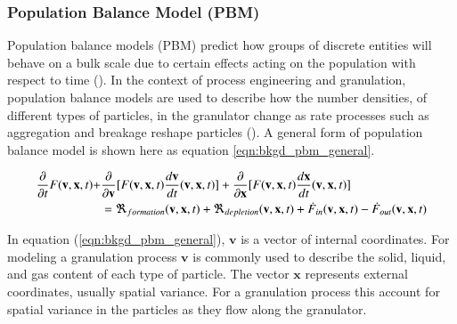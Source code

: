 \documentclass[preprint,11pt,authoryear]{elsarticle}
\begin{document}
\subsubsection{Population Balance Model (PBM)}
     Population balance models (PBM) predict how groups of discrete entities will behave on a 
    bulk scale due to certain effects acting on the population with respect to time 
    (\cite{ramkrishna2014}). In the context of process engineering and granulation, population 
    balance models are used to describe how the number densities, of different types of particles, in 
    the granulator change as rate processes such as aggregation and breakage reshape particles 
    (\cite{Barrasso2013}). A general form of population balance model is shown here as equation 
    \ref{eqn:bkgd_pbm_general}.
    
    \begin{align}
    \frac{ \partial}{\partial t}F(\textbf{v},\textbf{x},t) +& \frac{\partial}{\partial 
        \textbf{v}}[F(\textbf{v},\textbf{x},t)\frac{d\textbf{v}}{dt}(\textbf{v},\textbf{x},t)] + 
    \frac{\partial}{\partial \textbf{x}}[F(\textbf{v},\textbf{x},t)\frac{d\textbf{x}}{dt}(\textbf{v},\textbf{x},t)] 
    \notag\\
    &= 
    \Re_{formation}(\textbf{v},\textbf{x},t)+\Re_{depletion}(\textbf{v},\textbf{x},t)+\dot{F}_{in}(\textbf{v},
    \textbf{x},t)-\dot{F}_{out}(\textbf{v},\textbf{x},t)
    \label{eqn:bkgd_pbm_general} 
    \end{align}
    
 In equation (\ref{eqn:bkgd_pbm_general}), $\textbf{v}$ is a vector of internal coordinates. For 
modeling a granulation process $\textbf{v}$ is commonly used to describe the solid, liquid, and gas 
content of each type of particle. The vector $\textbf{x}$ represents external coordinates, usually 
spatial variance. For a granulation process this  account for spatial variance in the particles as they 
flow along the granulator.
\end{document}
